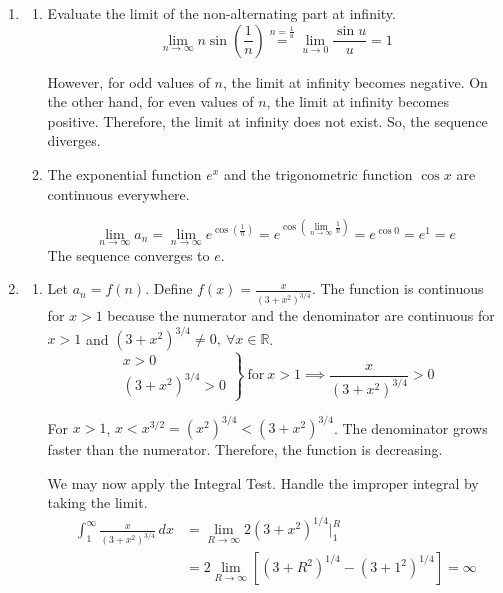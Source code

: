 \documentclass[a4paper, 12pt]{article}
\begin{document}
\begin{enumerate}[leftmargin=*,label=\textbf{\arabic*.}]

\item \begin{enumerate}[leftmargin=*,label=\textbf{\alph*.}]
\item Evaluate the limit of the non-alternating part at infinity.
\[\lim_{n\to\infty}n\sin\left(\frac1n\right)\overset{n=\frac1u}{=}\lim_{u\to0}\frac{\sin u}u=1\]

However, for odd values of $n$, the limit at infinity becomes negative. On the other hand, for even values of $n$, the limit at infinity becomes positive. Therefore, the limit at infinity does not exist. So, the sequence diverges.
\item The exponential function $ e^x$ and the trigonometric function $\cos x$ are continuous everywhere.

\[\lim_{n\to\infty}a_n=\lim_{n\to\infty} e^{\displaystyle\cos\left(\frac1n\right)}= e^{\displaystyle\cos\left(\lim_{n\to\infty}\frac1n\right)}= e^{\cos0}= e^1= e\]
The sequence converges to $\boxed{ e}$.
\end{enumerate}

\item \begin{enumerate}[leftmargin=*,label=\textbf{\alph*.}]

\item Let $a_n=f(n)$. Define $\displaystyle f(x)=\frac x{\left(3+x^2\right)^{3/4}}$. The function is continuous for $x>1$ because the numerator and the denominator are continuous for $x>1$ and $\left(3+x^2\right)^{3/4}\neq0,\:\forall x\in\mathbb{R}$.
\[\left.\begin{array}{c}
x>0\\
\left(3+x^2\right)^{3/4}>0
\end{array}\right\}\:\text{for}\:x>1\implies\frac x{\left(3+x^2\right)^{3/4}}>0\]

For $x>1$, $x<x^{3/2}=\left(x^2\right)^{3/4}<\left(3+x^2\right)^{3/4}$. The denominator grows faster than the numerator. Therefore, the function is decreasing.

We may now apply the Integral Test. Handle the improper integral by taking the limit.
\begin{align*}
\int_1^\infty\frac{x}{(3+x^2)^{3/4}}\,dx
&= \lim_{R\to\infty}2(3+x^2)^{1/4}\bigg|_1^R\\[1em]
&= 2\lim_{R\to\infty}\left[(3+R^2)^{1/4}-(3+1^2)^{1/4}\right]= \infty
\end{align*}


\end{enumerate}
\end{enumerate}
\end{document}
